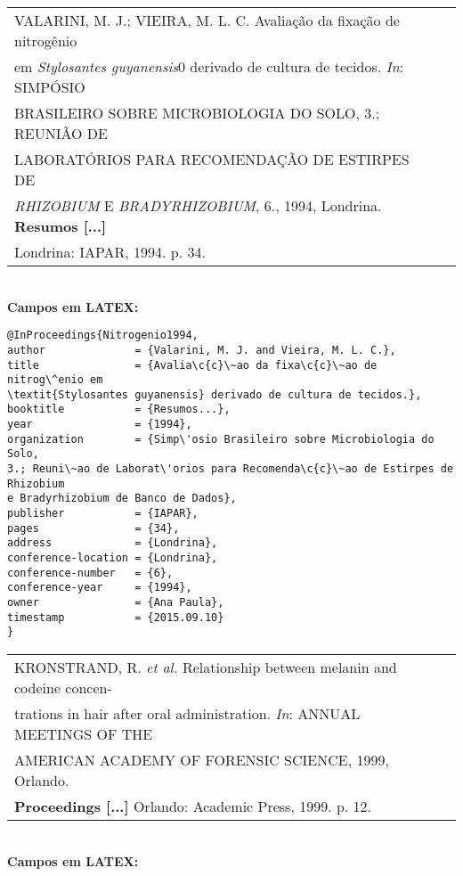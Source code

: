 \begin{tabular}{|l|c|} \hline
	VALARINI, M. J.; VIEIRA, M. L. C. Avalia\c{c}\~ao da fixa\c{c}\~ao de nitrog\^enio \\ em \textit{Stylosantes guyanensis}0 derivado de cultura de tecidos. \textit{In}: SIMP\'OSIO \\ BRASILEIRO SOBRE MICROBIOLOGIA DO SOLO, 3.; REUNI\~AO DE \\ LABORAT\'ORIOS PARA RECOMENDA\c{C}\~AO DE ESTIRPES DE \\ \textit{RHIZOBIUM} E \textit{BRADYRHIZOBIUM}, 6., 1994, Londrina. \textbf{Resumos [...]} \\ Londrina: IAPAR, 1994. p. 34. \\\hline
\end{tabular} \\

\textbf{Campos em LATEX:} 


\begin{verbatim}
@InProceedings{Nitrogenio1994,
author              = {Valarini, M. J. and Vieira, M. L. C.},
title               = {Avalia\c{c}\~ao da fixa\c{c}\~ao de nitrog\^enio em 
\textit{Stylosantes guyanensis} derivado de cultura de tecidos.},
booktitle           = {Resumos...},
year                = {1994},
organization        = {Simp\'osio Brasileiro sobre Microbiologia do Solo, 
3.; Reuni\~ao de Laborat\'orios para Recomenda\c{c}\~ao de Estirpes de Rhizobium 
e Bradyrhizobium de Banco de Dados},
publisher           = {IAPAR},
pages               = {34},
address             = {Londrina},
conference-location = {Londrina},
conference-number   = {6},
conference-year     = {1994},
owner               = {Ana Paula},
timestamp           = {2015.09.10}
}
\end{verbatim}

\begin{tabular}{|l|c|} \hline
	KRONSTRAND, R. \textit{et al.} Relationship between melanin and codeine
	concen-\\trations in hair after oral administration. \textit{In}: ANNUAL MEETINGS OF THE \\AMERICAN  ACADEMY OF FORENSIC SCIENCE, 1999, Orlando. \\\textbf{Proceedings [...]} Orlando:  Academic Press, 1999. p. 12.   \\\hline
\end{tabular} \\

\textbf{Campos em LATEX:} 

